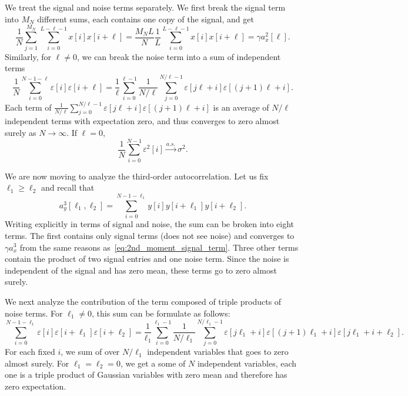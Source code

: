 \documentclass[english,11pt]{article}
\numberwithin{equation}{section}
\theoremstyle{plain}
\theoremstyle{definition}
\theoremstyle{remark}
\theoremstyle{plain}
\theoremstyle{remark}
\theoremstyle{plain}
\theoremstyle{plain}
\begin{document}
We treat the signal and noise terms separately. We first break the signal term into $M_N$ different sums, each contains one copy of the signal, and get
\begin{equation} \label{eq:2nd_moment_signal_term}
\frac{1}{N}\sum_{j=1}^{M_N}\sum_{i=0}^{L-\ell-1}x[i]x[i+\ell] = \frac{M_NL}{N}\frac{1}{L}\sum_{i=0}^{L-\ell-1}x[i]x[i+\ell] = \gamma a_x^2[\ell].
\end{equation}
Similarly, for $\ell\neq 0$, we can break the noise term into a sum of independent terms 
\begin{equation}
\frac{1}{N}\sum_{i=0}^{N-1-\ell} \varepsilon[i]\varepsilon[i+\ell] = \frac{1}{\ell}\sum_{i=0}^{\ell-1}\frac{1}{N/\ell}\sum_{j=0}^{N/\ell -1} \varepsilon[j\ell + i] \varepsilon[(j+1)\ell + i].
\end{equation}
Each term of $\frac{1}{N/\ell}\sum_{j=0}^{N/\ell -1} \varepsilon[j\ell + i] \varepsilon[(j+1)\ell + i]$ is an average of $N/\ell$ independent terms with expectation zero, and thus converges to zero almost surely as $N\to\infty$.
If $\ell=0$, 
\begin{equation}
\frac{1}{N}\sum_{i=0}^{N-1} \varepsilon^2[i] \xrightarrow{a.s.} \sigma^2.
\end{equation}

We are now moving to analyze the third-order autocorrelation. Let us fix $\ell_1\geq\ell_2$ and recall that 
\begin{equation*}
a_y^3[\ell_1,\ell_2] = \sum_{i=0}^{N-1-\ell_1} y[i]y[i+\ell_1]y[i+\ell_2]. 
\end{equation*}
Writing explicitly in terms of signal and noise, the sum can be broken into eight terms. The first contains only signal terms (does not see noise) and converges to $\gamma a_x^3$ from the same reasons as~\eqref{eq:2nd_moment_signal_term}. Three other terms contain the product of two signal entries and one noise term. Since the noise is independent of the signal and has zero mean, these terms go to zero almost surely.

We next analyze the contribution of the term composed of triple products of noise terms. For $\ell_1\neq 0$, this sum can be formulate as follows:
\begin{equation*}
\sum_{i=0}^{N-1-\ell_1} \varepsilon[i]\varepsilon[i+\ell_1]\varepsilon[i+\ell_2] = \frac{1}{\ell_1}\sum_{i=0}^{\ell_1-1}\frac{1}{N/\ell_1}\sum_{j=0}^{N/\ell_1 -1 }\varepsilon[j\ell_1+i]\varepsilon[(j+1)\ell_1+i]\varepsilon[j\ell_1+i+\ell_2].
\end{equation*}
For each fixed $i$, we sum of over $N/\ell_1$ independent variables that goes to zero almost surely. For $\ell_1=\ell_2=0$, we get a some of $N$ independent variables, each one is a triple product of Gaussian variables with zero mean and therefore has zero expectation. 
\end{document}
